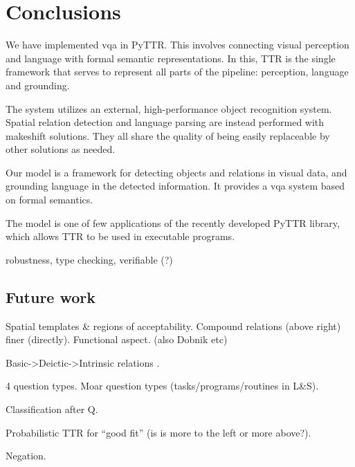\section{Conclusions}
\label{sec:conclusions}

We have implemented \gls{vqa} in PyTTR.
This involves connecting visual perception and language with formal semantic representations.
In this, TTR is the single framework that serves to represent all parts of the pipeline: perception, language and grounding.

The system utilizes an external, high-performance object recognition system.
Spatial relation detection and language parsing are instead performed with makeshift solutions.
They all share the quality of being easily replaceable by other solutions as needed.

Our model is a framework for detecting objects and relations in visual data, and grounding language in the detected information.
It provides a \gls{vqa} system based on formal semantics.

The model is one of few applications of the recently developed PyTTR library, which allows TTR to be used in executable programs.


robustness, type checking, verifiable (?)



\subsection{Future work}


Spatial templates \& regions of acceptability. Compound relations (above right) finer (directly). Functional aspect.  \cite{LoganComputationalAnalysisApprehension1996} (also Dobnik etc)

Basic->Deictic->Intrinsic relations  \cite{LoganComputationalAnalysisApprehension1996}.

4 question types.
Moar question types (tasks/programs/routines in L\&S).


Classification after Q.

Probabilistic TTR for ``good fit'' (is is more to the left or more above?).

Negation.
